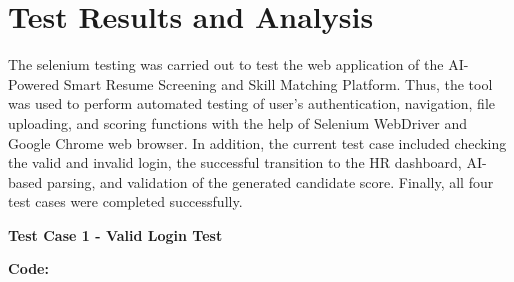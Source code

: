 \documentclass[12pt,a4paper]{report}
\begin{document}
\section{Test Results and Analysis}

The selenium testing was carried out to test the web application of the AI-Powered Smart Resume Screening and Skill Matching Platform. Thus, the tool was used to perform automated testing of user’s authentication, navigation, file uploading, and scoring functions with the help of Selenium WebDriver and Google Chrome web browser. In addition, the current test case included checking the valid and invalid login, the successful transition to the HR dashboard, AI-based parsing, and validation of the generated candidate score. Finally, all four test cases were completed successfully.


\textbf{Test Case 1 - Valid Login Test}

\textbf{Code:}
\end{document}
